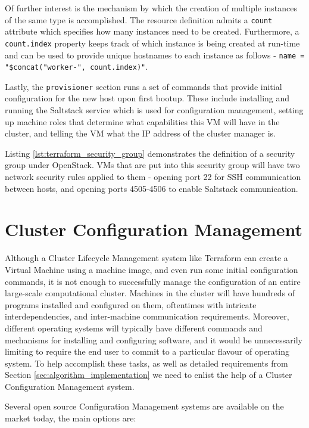 Of further interest is the mechanism by which the creation of multiple instances of the same type is accomplished. The resource definition admits a \texttt{count} attribute which specifies how many instances need to be created. Furthermore, a \texttt{count.index} property keeps track of which instance is being created at run-time and can be used to provide unique hostnames to each instance as follows -   \texttt{name = "\${concat("worker-", count.index)}"}.

Lastly, the \texttt{provisioner} section runs a set of commands that provide initial configuration for the new host upon first bootup. These include installing and running the Saltstack service which is used for configuration management, setting up machine roles  that determine what capabilities this VM will have in the cluster, and telling the VM what the IP address of the cluster manager is.

Listing \ref{lst:terraform_security_group} demonstrates the definition of a security group under OpenStack. VMs that are put into this security group will have two network security rules applied to them - opening port 22 for SSH communication between hosts, and opening ports 4505-4506 to enable Saltstack communication.

\section{Cluster Configuration Management}

Although a Cluster Lifecycle Management system like Terraform can create a Virtual Machine using a machine image, and even run some initial configuration commands, it is not enough to successfully manage the configuration of an entire large-scale computational cluster. Machines in the cluster will have hundreds of programs installed and configured on them, oftentimes with intricate interdependencies, and inter-machine communication requirements. Moreover, different operating systems will typically have different commands and mechanisms for installing and configuring software, and it would be unnecessarily limiting to require the end user to commit to a particular flavour of operating system. To help accomplish these tasks, as well as detailed requirements from Section \ref{sec:algorithm_implementation} we need to enlist the help of a Cluster Configuration Management system.

Several open source Configuration Management systems are available on the market today, the main options are:


